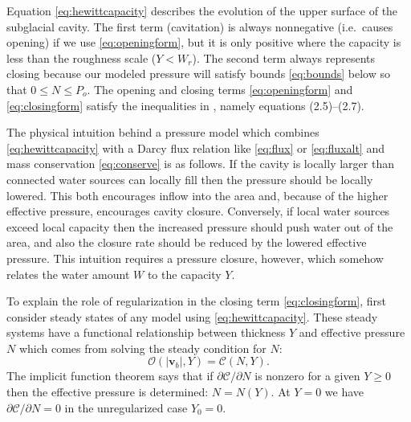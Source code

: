 \documentclass[11pt,final]{amsart}%
\newcommand\bv{\mathbf{v}}
\begin{document}
Equation \eqref{eq:hewittcapacity} describes the evolution of the upper surface of the subglacial cavity.  The first term (cavitation) is always nonnegative (i.e.~causes opening) if we use \eqref{eq:openingform}, but it is only positive where the capacity is less than the roughness scale ($Y<W_r$).  The second term always represents closing because our modeled pressure will satisfy bounds \eqref{eq:bounds} below so that $0\le N \le P_o$.  The opening and closing terms \eqref{eq:openingform} and \eqref{eq:closingform} satisfy the inequalities in \cite{Schoofetal2012}, namely equations (2.5)--(2.7).

The physical intuition behind a pressure model which combines \eqref{eq:hewittcapacity} with a Darcy flux relation like \eqref{eq:flux} or \eqref{eq:fluxalt} and mass conservation \eqref{eq:conserve} is as follows.  If the cavity is locally larger than connected water sources can locally fill then the pressure should be locally lowered.  This both encourages inflow into the area and, because of the higher effective pressure, encourages cavity closure.  Conversely, if local water sources exceed local capacity then the increased pressure should push water out of the area, and also the closure rate should be reduced by the lowered effective pressure.  This intuition requires a pressure closure, however, which somehow relates the water amount $W$ to the capacity $Y$.

To explain the role of regularization in the closing term \eqref{eq:closingform}, first consider steady states of any model using \eqref{eq:hewittcapacity}.  These steady systems have a functional relationship between thickness $Y$ and effective pressure $N$ which comes from solving the steady condition for $N$:
\begin{equation}
\mathcal{O}(|\bv_b|,Y) = \mathcal{C}(N,Y). \label{eq:hewittsteady}
\end{equation}
The implicit function theorem says that if $\partial\mathcal{C}/\partial N$ is nonzero for a given $Y\ge 0$ then the effective pressure is determined: $N=N(Y)$.  At $Y=0$ we have $\partial\mathcal{C}/\partial N=0$ in the unregularized case $Y_0=0$.
\end{document}
